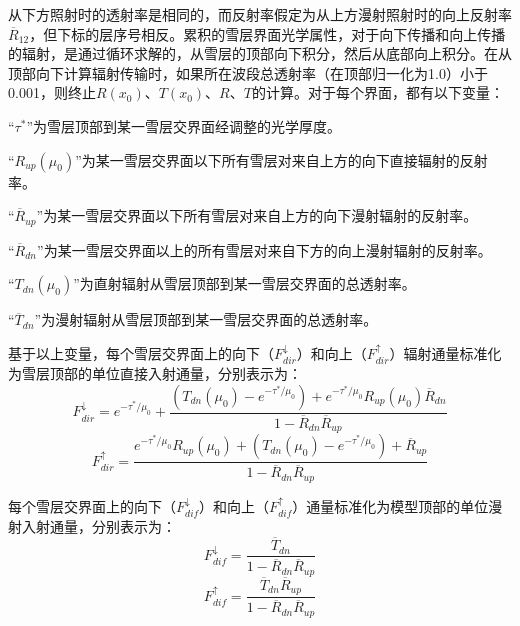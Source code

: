 从下方照射时的透射率是相同的，而反射率假定为从上方漫射照射时的向上反射率\({\overline{R}}_{12}\)，但下标的层序号相反。累积的雪层界面光学属性，对于向下传播和向上传播的辐射，是通过循环求解的，从雪层的顶部向下积分，然后从底部向上积分。在从顶部向下计算辐射传输时，如果所在波段总透射率（在顶部归一化为1.0）小于0.001，则终止\(R\left( x_{0} \right)\)、\(T\left( x_{0} \right)\)、\(R\)、\(T\)的计算。对于每个界面，都有以下变量：

``$\tau^{*}$''为雪层顶部到某一雪层交界面经调整的光学厚度。

``$R_{up}\left( \mu_{0} \right)$''为某一雪层交界面以下所有雪层对来自上方的向下直接辐射的反射率。

``$\overline{R}_{up}$''为某一雪层交界面以下所有雪层对来自上方的向下漫射辐射的反射率。

``$\overline{R}_{dn}$''为某一雪层交界面以上的所有雪层对来自下方的向上漫射辐射的反射率。

``$T_{dn}\left( \mu_{0} \right)$''为直射辐射从雪层顶部到某一雪层交界面的总透射率。

``$\overline{T}_{dn}$''为漫射辐射从雪层顶部到某一雪层交界面的总透射率。

基于以上变量，每个雪层交界面上的向下（\(F_{dir}^{\downarrow}\)）和向上（\(F_{dir}^{\uparrow}\)）辐射通量标准化为雪层顶部的单位直接入射通量，分别表示为：
\begin{equation}
F_{dir}^{\downarrow} = e^{- \tau^{*}/\mu_{0}} + \frac{\left( T_{dn}\left( \mu_{0} \right) - e^{- \tau^{*}/\mu_{0}} \right) + e^{- \tau^{*}/\mu_{0}}R_{up}\left( \mu_{0} \right){\overline{R}}_{dn}}{1 - {\overline{R}}_{dn}{\overline{R}}_{up}}
\end{equation}
\begin{equation}
F_{dir}^{\uparrow} = \frac{e^{- \tau^{*}/\mu_{0}}R_{up}\left( \mu_{0} \right) + \left( T_{dn}\left( \mu_{0} \right) - e^{- \tau^{*}/\mu_{0}} \right) + {\overline{R}}_{up}}{1 - {\overline{R}}_{dn}{\overline{R}}_{up}}
\end{equation}

每个雪层交界面上的向下（\(F_{dif}^{\downarrow}\)）和向上（\(F_{dif}^{\uparrow}\)）通量标准化为模型顶部的单位漫射入射通量，分别表示为：
\begin{equation}
F_{dif}^{\downarrow} = \frac{{\overline{T}}_{dn}}{1 - {\overline{R}}_{dn}{\overline{R}}_{up}}
\end{equation}
\begin{equation}
F_{dif}^{\uparrow} = \frac{{\overline{T}}_{dn}{\overline{R}}_{up}}{1 - {\overline{R}}_{dn}{\overline{R}}_{up}}
\end{equation}


